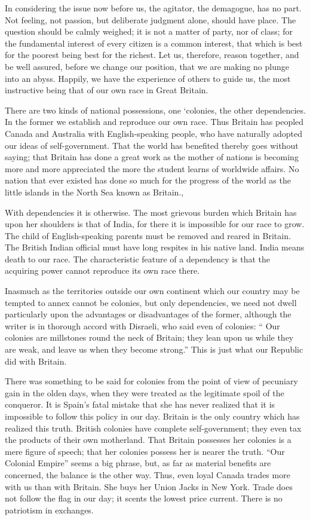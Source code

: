 \documentclass[11pt,openany]{book}
\begin{document}
In considering the issue now before us, the agitator, the demagogue, has no part. Not feeling, not passion, but deliberate judgment alone, should have place. The question should be calmly weighed; it is not a matter of party, nor of class; for the fundamental interest of every citizen is a common interest, that which is best for the poorest being best for the richest. Let us, therefore, reason together, and be well assured, before we change our position, that we are making no plunge into an abyss. Happily, we have the experience of others to guide us, the most instructive being that of our own race in Great Britain.

There are two kinds of national possessions, one `colonies, the other dependencies. In the former we establish and reproduce our own race. Thus Britain has peopled Canada and Australia with English-speaking people, who have naturally adopted our ideas of self-government. That the world has benefited thereby goes without saying; that Britain has done a great work as the mother of nations is becoming more and more appreciated the more the student learns of worldwide affairs. No nation that ever existed has done so much for the progress of the world as the little islands in the North Sea known as Britain.,

With dependencies it is otherwise. The most grievous burden which Britain has upon her shoulders is that of India, for there it is impossible for our race to grow. The child of English-speaking parents must be removed and reared in Britain. The British Indian official must have long respites in his native land. India means death to our race. The characteristic feature of a dependency is that the acquiring power cannot reproduce its own race there.

Inasmuch as the territories outside our own continent which our country may be tempted to annex cannot be colonies, but only dependencies, we need not dwell particularly upon the advantages or disadvantages of the former, although the writer is in thorough accord with Disraeli, who said even of colonies: `` Our colonies are millstones round the neck of Britain; they lean upon us while they are weak, and leave us when they become strong.'' This is just what our Republic did with Britain.

There was something to be said for colonies from the point of view of pecuniary gain in the olden days, when they were treated as the legitimate spoil of the conqueror. It is Spain's fatal mistake that she has never realized that it is impossible to follow this policy in our day. Britain is the only country which has realized this truth. British colonies have complete self-government; they even tax the products of their own motherland. That Britain possesses her colonies is a mere figure of speech; that her colonies possess her is nearer the truth. ``Our Colonial Empire'' seems a big phrase, but, as far as material benefits are concerned, the balance is the other way. Thus, even loyal Canada trades more with us than with Britain. She buys her Union Jacks in New York. Trade does not follow the flag in our day; it scents the lowest price current. There is no patriotism in exchanges.
\end{document}
